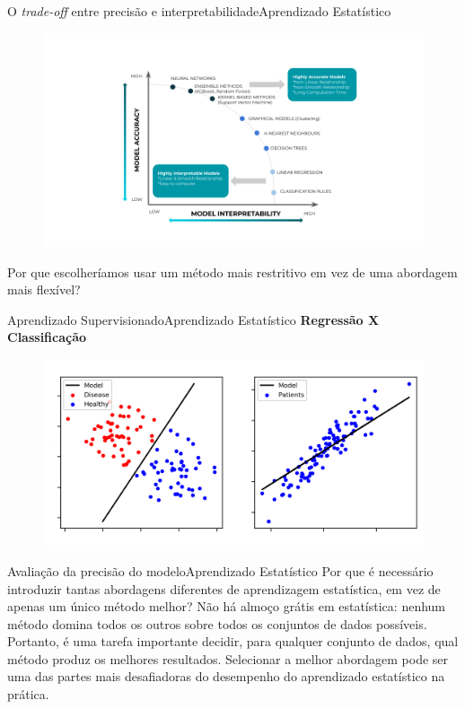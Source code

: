 \documentclass[t]{beamer}
\begin{document}

\begin{ftst}{O \textit{trade-off} entre precisão e interpretabilidade}{{Aprendizado Estatístico}}
\begin{figure}
    \centering
    \includegraphics[trim=120 60 80 80,clip,scale=0.4]{Figuras/slide03_10.png}
\end{figure}
\small
Por que escolheríamos usar um método mais restritivo em vez de uma abordagem mais flexível?
\end{ftst}


\begin{ftst}{Aprendizado Supervisionado}{{Aprendizado Estatístico}}
\textbf{Regressão X Classificação}
\begin{figure}
    \centering
    \includegraphics[scale=0.25]{Figuras/slide03_11.png}
\end{figure}
\end{ftst}


\begin{ftst}{Avaliação da precisão do modelo}{{Aprendizado Estatístico}}
\justifying
Por que é necessário introduzir tantas abordagens diferentes de aprendizagem estatística, em vez de apenas um único método melhor? 
\vone
Não há almoço grátis em estatística: nenhum método domina todos os outros sobre todos os conjuntos de dados possíveis.
\vone
Portanto, é uma tarefa importante decidir, para qualquer conjunto de dados, qual método produz os melhores resultados. 
\vone
Selecionar a melhor abordagem pode ser uma das partes mais desafiadoras do desempenho do aprendizado estatístico na prática.
\end{ftst}
\end{document}
